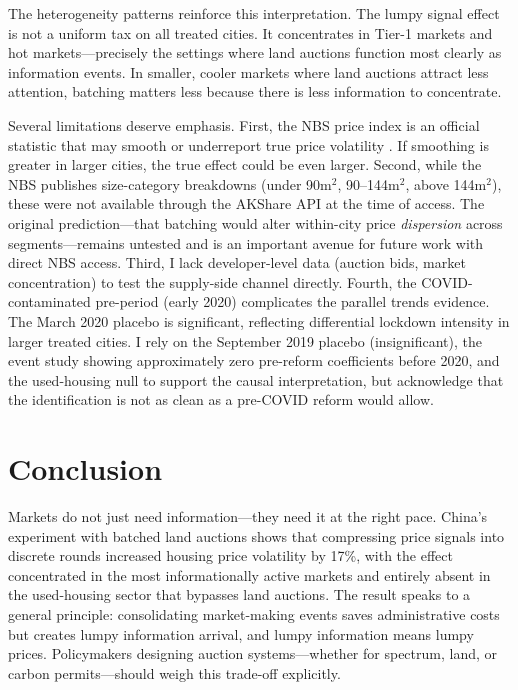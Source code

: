 \documentclass[12pt]{article}
\begin{document}
The heterogeneity patterns reinforce this interpretation. The lumpy signal effect is not a uniform tax on all treated cities. It concentrates in Tier-1 markets and hot markets---precisely the settings where land auctions function most clearly as information events. In smaller, cooler markets where land auctions attract less attention, batching matters less because there is less information to concentrate.

Several limitations deserve emphasis. First, the NBS price index is an official statistic that may smooth or underreport true price volatility \citep{deng2012land}. If smoothing is greater in larger cities, the true effect could be even larger. Second, while the NBS publishes size-category breakdowns (under 90m$^2$, 90--144m$^2$, above 144m$^2$), these were not available through the AKShare API at the time of access. The original prediction---that batching would alter within-city price \textit{dispersion} across segments---remains untested and is an important avenue for future work with direct NBS access. Third, I lack developer-level data (auction bids, market concentration) to test the supply-side channel directly. Fourth, the COVID-contaminated pre-period (early 2020) complicates the parallel trends evidence. The March 2020 placebo is significant, reflecting differential lockdown intensity in larger treated cities. I rely on the September 2019 placebo (insignificant), the event study showing approximately zero pre-reform coefficients before 2020, and the used-housing null to support the causal interpretation, but acknowledge that the identification is not as clean as a pre-COVID reform would allow.

\section{Conclusion}

Markets do not just need information---they need it at the right pace. China's experiment with batched land auctions shows that compressing price signals into discrete rounds increased housing price volatility by 17\%, with the effect concentrated in the most informationally active markets and entirely absent in the used-housing sector that bypasses land auctions. The result speaks to a general principle: consolidating market-making events saves administrative costs but creates lumpy information arrival, and lumpy information means lumpy prices. Policymakers designing auction systems---whether for spectrum, land, or carbon permits---should weigh this trade-off explicitly.
\end{document}
